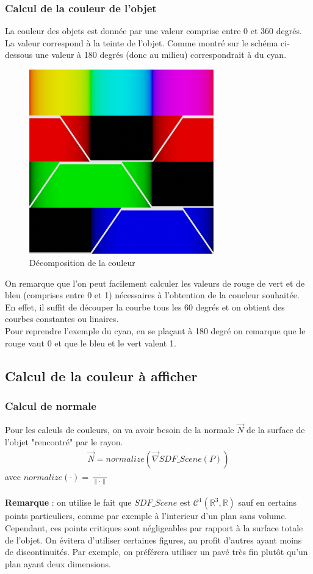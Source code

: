\newpage
\subsubsection{Calcul de la couleur de l'objet}

La couleur des objets est donnée par une valeur comprise entre 0 et 360 degrés. La valeur correspond à la teinte de l'objet. Comme montré sur le schéma ci-dessous une valeur à 180 degrés (donc au milieu) correspondrait à du cyan.

\begin{figure}[h]
    \centering
    \includegraphics[width=8cm]{images/huetorgb.jpg}
    \caption{Décomposition de la couleur }
    \label{fig:huetorb}
\end{figure}

On remarque que l'on peut facilement calculer les valeurs de rouge de vert et de bleu (comprises entre 0 et 1) nécessaires à l'obtention de la coueleur souhaitée.\\
En effet, il suffit de découper la courbe tous les 60 degrés et on obtient des courbes constantes ou linaires.\\
Pour reprendre l'exemple du cyan, en se plaçant à 180 degré on remarque que le rouge vaut 0 et que le bleu et le vert valent 1.

\subsection{Calcul de la couleur à afficher}
\subsubsection{Calcul de normale}
Pour les calculs de couleurs, on va avoir besoin de la normale $\Vec{N}$ de la surface de l'objet "rencontré" par le rayon.
\begin{align*}
    \Vec{N}=normalize(\Vec{\nabla}SDF\_Scene(P))
\end{align*}
avec $normalize(\cdot )=\frac{\cdot }{\|\cdot \|}$\\
\\
\textbf{Remarque} : on utilise le fait que $SDF\_Scene$ est $\mathcal{C}^1(\mathbb{R}^3,\mathbb{R})$ sauf en certains points particuliers, comme par exemple à l'interieur d'un plan sans volume. Cependant, ces points critiques sont négligeables par rapport à la surface totale de l'objet. On évitera d'utiliser certaines figures, au profit d'autres ayant moins de discontinuités. Par exemple, on préférera utiliser un pavé très fin plutôt qu'un plan ayant deux dimensions.

